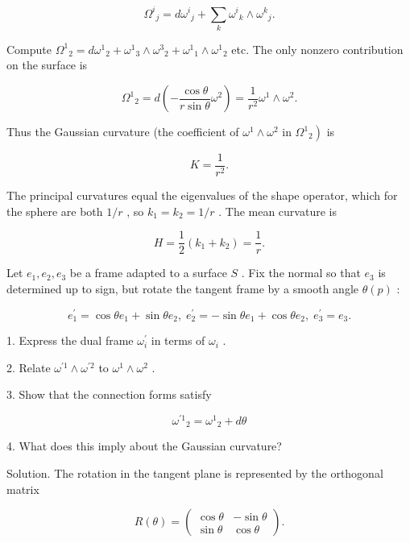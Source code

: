 \documentclass[10pt]{article}
\begin{document}
\[
{\Omega }^{i}{}_{j} = d{\omega }^{i}{}_{j} + \mathop{\sum }\limits_{k}{\omega }^{i}{}_{k} \land  {\omega }^{k}{}_{j}.
\]

Compute \({\Omega }^{1}{}_{2} = d{\omega }^{1}{}_{2} + {\omega }^{1}{}_{3} \land  {\omega }^{3}{}_{2} + {\omega }^{1}{}_{1} \land  {\omega }^{1}{}_{2}\) etc. The only nonzero contribution on the surface is

\[
{\Omega }^{1}{}_{2} = d\left( {-\frac{\cos \theta }{r\sin \theta }{\omega }^{2}}\right)  = \frac{1}{{r}^{2}}{\omega }^{1} \land  {\omega }^{2}.
\]

Thus the Gaussian curvature (the coefficient of \({\omega }^{1} \land  {\omega }^{2}\) in \(\left. {{\Omega }^{1}{}_{2}}\right)\) is

\[
K = \frac{1}{{r}^{2}}.
\]

The principal curvatures equal the eigenvalues of the shape operator, which for the sphere are both \(1/r\) , so \({k}_{1} = {k}_{2} = 1/r\) . The mean curvature is

\[
H = \frac{1}{2}\left( {{k}_{1} + {k}_{2}}\right)  = \frac{1}{r}.
\]

\begin{problem}[title=PROBLEM 2 (7 POINTS)]
Let \({e}_{1},{e}_{2},{e}_{3}\) be a frame adapted to a surface \(S\) . Fix the normal so that \({e}_{3}\) is determined up to sign, but rotate the tangent frame by a smooth angle \(\theta \left( p\right)\) :

\[
{e}_{1}^{\prime } = \cos \theta {e}_{1} + \sin \theta {e}_{2},\;{e}_{2}^{\prime } =  - \sin \theta {e}_{1} + \cos \theta {e}_{2},\;{e}_{3}^{\prime } = {e}_{3}.
\]

1. Express the dual frame \({\omega }_{i}^{\prime }\) in terms of \({\omega }_{i}\) .

2. Relate \({\omega }^{\prime 1} \land  {\omega }^{\prime 2}\) to \({\omega }^{1} \land  {\omega }^{2}\) .

3. Show that the connection forms satisfy

\[
{\omega }^{\prime 1}{}_{2} = {\omega }^{1}{}_{2} + {d\theta }
\]

4. What does this imply about the Gaussian curvature?
\end{problem}

Solution. The rotation in the tangent plane is represented by the orthogonal matrix

\[
R\left( \theta \right)  = \left( \begin{matrix} \cos \theta &  - \sin \theta \\  \sin \theta & \cos \theta  \end{matrix}\right) .
\]
\end{document}
